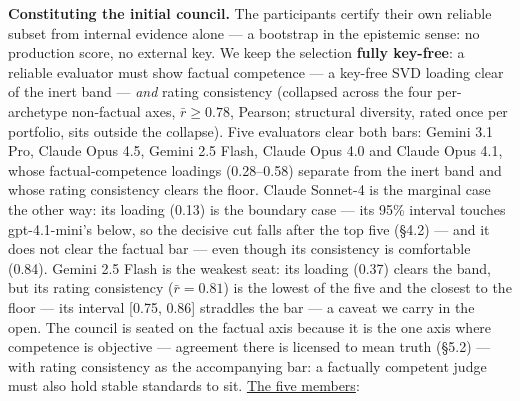 \textbf{Constituting the initial council.} The participants certify their own reliable subset from internal evidence alone --- a bootstrap in the epistemic sense: no production score, no external key. We keep the selection \textbf{fully key-free}: a reliable evaluator must show factual competence --- a key-free SVD loading clear of the inert band --- \emph{and} rating consistency (collapsed across the four per-archetype non-factual axes, \(\bar r \ge 0.78\), Pearson; structural diversity, rated once per portfolio, sits outside the collapse). Five evaluators clear both bars: Gemini 3.1 Pro, Claude Opus 4.5, Gemini 2.5 Flash, Claude Opus 4.0 and Claude Opus 4.1, whose factual-competence loadings (0.28--0.58) separate from the inert band and whose rating consistency clears the floor. Claude Sonnet-4 is the marginal case the other way: its loading (0.13) is the boundary case --- its 95\% interval touches gpt-4.1-mini's below, so the decisive cut falls after the top five (§4.2) --- and it does not clear the factual bar --- even though its consistency is comfortable (0.84). Gemini 2.5 Flash is the weakest seat: its loading (0.37) clears the band, but its rating consistency (\(\bar r = 0.81\)) is the lowest of the five and the closest to the floor --- its interval {[}0.75, 0.86{]} straddles the bar --- a caveat we carry in the open. The council is seated on the factual axis because it is the one axis where competence is objective --- agreement there is licensed to mean truth (§5.2) --- with rating consistency as the accompanying bar: a factually competent judge must also hold stable standards to sit. \hyperref[tab-initial-council]{The five members}:

\protect{}\label{tab-initial-council}{}

